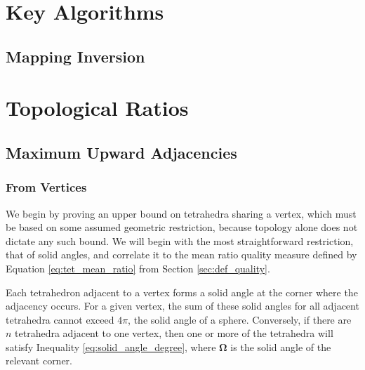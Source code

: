 
\appendix    %

\chapter{Key Algorithms}

\section{Mapping Inversion}

\chapter{Topological Ratios}

\section{Maximum Upward Adjacencies}

\subsection{From Vertices}
\label{app:vert_up_deg}

We begin by proving an upper bound on tetrahedra sharing a vertex,
which must be based on some assumed geometric restriction,
because topology alone does not dictate any such bound.
We will begin with the most straightforward restriction, that
of solid angles, and correlate it to the mean ratio quality measure
defined by Equation \ref{eq:tet_mean_ratio} from Section \ref{sec:def_quality}.

Each tetrahedron adjacent to a vertex forms a solid angle at
the corner where the adjacency occurs.
For a given vertex, the sum of these solid angles for all
adjacent tetrahedra cannot exceed $4\pi$, the solid angle of a sphere.
Conversely, if there are $n$ tetrahedra adjacent to one vertex,
then one or more of the tetrahedra will satisfy Inequality
\ref{eq:solid_angle_degree}, where $\mathbf{\Omega}$ is the
solid angle of the relevant corner.

